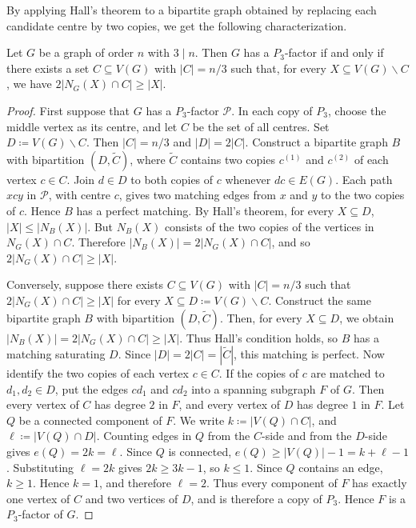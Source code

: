 \documentclass{patmorin}
\newcommand{\sm}{\smallsetminus}
\begin{document}
By applying Hall's theorem to a bipartite graph obtained by replacing each
candidate centre by two copies, we get the following characterization.

\begin{thm}\label{thm:p3-factor-hall}
Let $G$ be a graph of order $n$ with $3\mid n$. Then $G$ has a $P_3$-factor if
and only if there exists a set $C\subseteq V(G)$ with $|C|=n/3$ such that, for
every $X\subseteq V(G)\sm C$, we have $2|N_G(X)\cap C|\ge |X|$.
\end{thm}

\begin{proof}
First suppose that $G$ has a $P_3$-factor $\mathcal P$. In each copy of
$P_3$, choose the middle vertex as its centre, and let $C$ be the set of all
centres. Set $D\coloneqq V(G)\sm C$. Then $|C|=n/3$ and 
$|D|=2|C|$.
Construct a bipartite graph $B$ with bipartition $(D,\widetilde C)$, where
$\widetilde C$ contains two copies $c^{(1)}$ and $c^{(2)}$ of each vertex
$c\in C$. Join $d\in D$ to both copies of $c$ whenever $dc\in E(G)$. Each
path $xcy$ in $\mathcal P$, with centre $c$, gives two matching edges from
$x$ and $y$ to the two copies of $c$. Hence $B$ has a perfect matching. By
Hall's theorem, for every $X\subseteq D$, $|X|\le |N_B(X)|$.
But $N_B(X)$ consists of the two copies of the vertices in $N_G(X)\cap C$.
Therefore $|N_B(X)|=2|N_G(X)\cap C|$,
and so $2|N_G(X)\cap C|\ge |X|$.

Conversely, suppose there exists $C\subseteq V(G)$ with $|C|=n/3$ such that $2|N_G(X)\cap C|\ge |X|$
for every $X\subseteq D\coloneqq V(G)\sm C$. 
Construct the same bipartite
graph $B$ with bipartition $(D,\widetilde C)$. Then, for every $X\subseteq D$,
we obtain $|N_B(X)|=2|N_G(X)\cap C|\ge |X|$.
Thus Hall's condition holds, so $B$ has a matching saturating $D$. Since
$|D|=2|C|=|\widetilde C|$, this matching is perfect.
Now identify the two copies of each vertex $c\in C$. If the copies of $c$ are
matched to $d_1,d_2\in D$, put the edges $cd_1$ and $cd_2$ into a spanning
subgraph $F$ of $G$. 
Then every vertex of $C$ has degree $2$ in $F$, and every
vertex of $D$ has degree $1$ in $F$.
Let $Q$ be a connected component of $F$. 
We write $k\coloneqq|V(Q)\cap C|$, and  $\ell\coloneqq|V(Q)\cap D|$.
Counting edges in $Q$ from the $C$-side and from the $D$-side gives $e(Q)=2k=\ell$.
Since $Q$ is connected, $e(Q)\ge |V(Q)|-1=k+\ell-1$.
Substituting $\ell=2k$ gives $2k\ge 3k-1$,
so $k\le 1$. Since $Q$ contains an edge, $k\ge 1$. Hence $k=1$, and therefore
$\ell=2$. Thus every component of $F$ has exactly one vertex of $C$ and two
vertices of $D$, and is therefore a copy of $P_3$. Hence $F$ is a
$P_3$-factor of $G$.
\end{proof}
\end{document}
